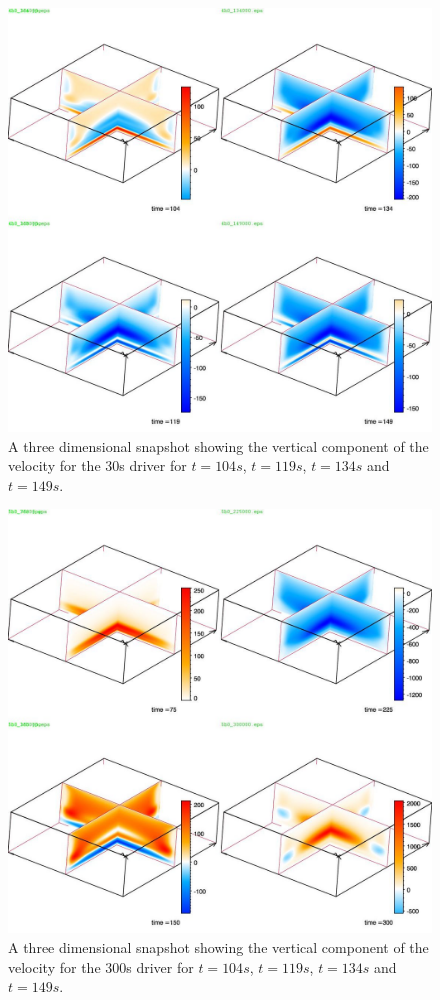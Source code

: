 \documentclass{aa}
\begin{document}
\begin{figure}[h]
\includegraphics[scale=0.5]{images/4b0_3d.jpg}
\caption{A three dimensional snapshot showing the vertical component of the velocity for the 30s driver for $t=104s$, $t=119s$, $t=134s$ and $t=149s$. }
\end{figure}



\begin{figure}[h]
\includegraphics[scale=0.5]{images/5b0_3d.jpg}
\caption{A three dimensional snapshot showing the vertical component of the velocity for the 300s driver for $t=104s$, $t=119s$, $t=134s$ and $t=149s$. }
\end{figure}
\end{document}
